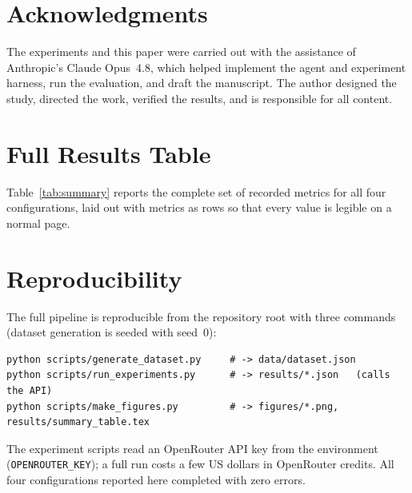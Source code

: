 \documentclass[11pt]{article}
\begin{document}
\section*{Acknowledgments}
The experiments and this paper were carried out with the assistance of Anthropic's
Claude Opus~4.8, which helped implement the agent and experiment harness, run the
evaluation, and draft the manuscript. The author designed the study, directed the
work, verified the results, and is responsible for all content.



\appendix
\section{Full Results Table}
\label{app:fulltable}

Table~\ref{tab:summary} reports the complete set of recorded metrics for all four
configurations, laid out with metrics as rows so that every value is legible on a
normal page.



\section{Reproducibility}
\label{app:repro}

The full pipeline is reproducible from the repository root with three commands
(dataset generation is seeded with seed~0):

\begin{verbatim}
python scripts/generate_dataset.py     # -> data/dataset.json
python scripts/run_experiments.py      # -> results/*.json   (calls the API)
python scripts/make_figures.py         # -> figures/*.png, results/summary_table.tex
\end{verbatim}

The experiment scripts read an OpenRouter API key from the environment
(\texttt{OPENROUTER\_KEY}); a full run costs a few US dollars in OpenRouter
credits. All four configurations reported here completed with zero errors.
\end{document}
